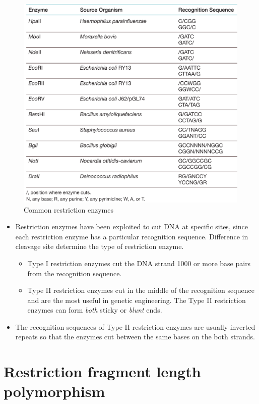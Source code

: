 \documentclass[11pt,dvipsnames,ignorenonframetext,aspectratio=169]{beamer}
\providecommand{\tightlist}{%
  \setlength{\itemsep}{0pt}\setlength{\parskip}{0pt}}
\begin{document}
\begin{frame}{}
\protect\hypertarget{section-12}{}

\begin{figure}
\includegraphics[width=0.45\linewidth]{./../images/restriction_enzymes_ex} \caption{Common restriction enzymes}\label{fig:restriction-enzymes-ex}
\end{figure}

\end{frame}

\begin{frame}{}
\protect\hypertarget{section-13}{}

\begin{itemize}
\item
  Restriction enzymes have been exploited to cut DNA at specific sites,
  since each restriction enzyme has a particular recognition sequence.
  Difference in cleavage site determine the type of restriction enzyme.

  \begin{itemize}
  \tightlist
  \item
    Type I restriction enzymes cut the DNA strand 1000 or more base
    pairs from the recognition sequence.
  \item
    Type II restriction enzymes cut in the middle of the recognition
    sequence and are the most useful in genetic engineering. The Type II
    restriction enzymes can form \emph{both} sticky or \emph{blunt}
    ends.
  \end{itemize}
\item
  The recognition sequences of Type II restriction enzymes are usually
  inverted repeats so that the enzymes cut between the same bases on the
  both strands.
\end{itemize}

\end{frame}

\hypertarget{restriction-fragment-length-polymorphism}{%
\section{Restriction fragment length
polymorphism}\label{restriction-fragment-length-polymorphism}}
\end{document}
